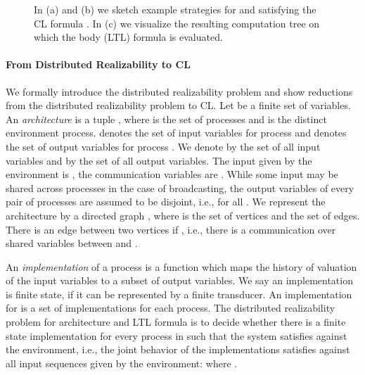 \documentclass{LMCS}
\theoremstyle{plain}\newtheorem{theorem}[thm]{Theorem}
\theoremstyle{plain}\newtheorem{lemma}[thm]{Lemma}
\theoremstyle{plain}\newtheorem{proposition}[thm]{Proposition}
\theoremstyle{plain}\newtheorem{corollary}[thm]{Corollary}
\theoremstyle{definition}\newtheorem{definition}{Definition}[section]
\begin{document}
\begin{figure}[t]
{
  \label{fig:ecl_semantics_example_computation_tree}
}
 
  \caption[]{In (a) and (b) we sketch example strategies for  and  satisfying the CL formula . In (c) we visualize the resulting computation tree on which the body (LTL) formula is evaluated.}
  \label{fig:ecl_semantics}
\end{figure}

\paragraph{\bf From Distributed Realizability to CL}
We formally introduce the distributed realizability problem and show reductions from the distributed realizability problem to CL.
Let  be a finite set of variables. An \textit{architecture}  is a tuple , where  is the set of processes and  is the distinct environment process.
 denotes the set of input variables for process  and  denotes the set of output variables for process .
We denote by  the set of all input variables and by  the set of all output variables.
The input given by the environment is , the communication variables are .
While some input may be shared across processes in the case of broadcasting, the output variables of every pair of processes are assumed to be disjoint, i.e.,  for all .
We represent the architecture  by a directed graph , where  is the set of vertices and  the set of edges.
There is an edge between two vertices  if , i.e., there is a communication over shared variables between  and .

An \textit{implementation} of a process  is a function  which maps the history of valuation of the input variables to a subset of output variables.
We say an implementation is finite state, if it can be represented by a finite transducer.
An implementation for  is a set of implementations for each process.
The distributed realizability problem for architecture  and LTL formula  is to decide whether there is a finite state implementation for every process in  such that the system satisfies  against the environment, i.e., the joint behavior of the implementations satisfies  against all input sequences given by the environment:  where .
\end{document}
